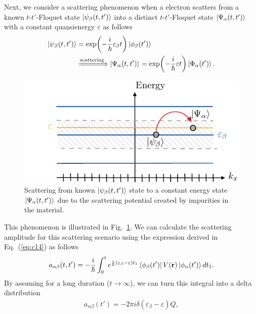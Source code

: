 \documentclass[
 reprint,
 amsmath,amssymb,
 aps,
 prb,
]{revtex4-2}
\begin{document}
Next, we consider a scattering phenomenon when a electron scatters from a known $t$-$t'$-Floquet state $\ket{\psi_{\beta}(t,t')} $ into a distinct $t$-$t'$-Floquet state $\ket{\Psi_{\alpha}(t,t')}$ with a constant quansienergy $\varepsilon$ as follows
\begin{equation} \label{eq:c15}
  \begin{aligned}
  \ket{\psi_{\beta}(t,t')} &= \exp(-\frac{i}{\hbar}\varepsilon_{\beta} t)
  \ket{\phi_{\beta}(t')} \\
  &
  \xRightarrow{\text{scattering}}
  \ket{\Psi_{\alpha}(t,t')} = \exp(-\frac{i}{\hbar}\varepsilon t)
  \ket{\Phi_{\alpha}(t')}.
  \end{aligned}
\end{equation}
\begin{figure}[b]
  \includegraphics[scale=1.0]{fig_6_scattering_scenario.pdf}
  \caption{Scattering from known $\ket{\psi_{\beta}(t,t')}$ state to a constant energy state $\ket{\Psi_{\alpha}(t,t')}$ due to the scattering potential created by impurities in the material.}
  \label{fig:2}
\end{figure}
This phenomenon is illustrated in Fig.~\ref{fig:2}.
We can calculate the scattering amplitude for this scattering scenario using the expression derived in Eq.~(\ref{eq:c14}) as follows
\begin{equation} \label{eq:c16}
  \begin{aligned}
    a_{\alpha\beta}(t,t') =
    -\frac{i}{\hbar}
    \int_{0}^t
    e^{\frac{i}{\hbar}\left(\varepsilon_{\beta} - \varepsilon \right)t_1}
    \bra{\phi_{\beta}(t')}
    V(\vb{r}) \ket{\phi_{\alpha}(t')}  dt_1.
  \end{aligned}
\end{equation}
By assuming for a long duration ($t \rightarrow \infty$), we can turn this integral into a delta distribution
\begin{equation} \label{eq:c17}
  \begin{aligned}
    a_{\alpha\beta}(t') =
    -2\pi i \delta(\varepsilon_{\beta} - \varepsilon)Q,
  \end{aligned}
\end{equation}
\end{document}
